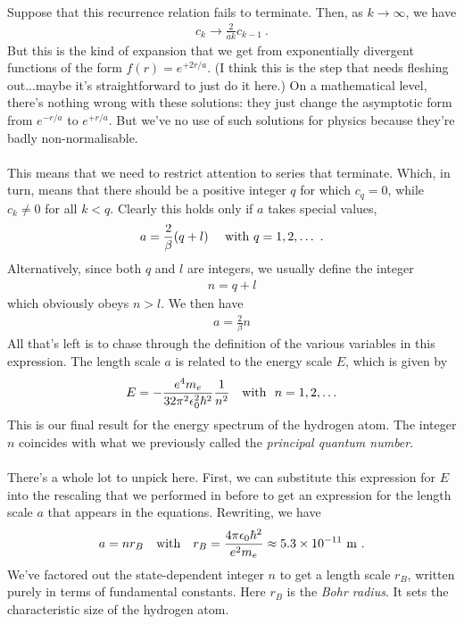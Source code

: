 \documentclass[12pt]{article}
\def\be{\begin{eqnarray}}
\def\ee{\end{eqnarray}}
\newcommand{\nn}{\nonumber}
\newcommand\para{\paragraph{}}
\newcommand{\co}{\color{olive}}
\newcommand{\cblue}{\color{blue}}
\begin{document}
{\para
{\co Suppose that this recurrence relation fails to terminate. Then, as $k\rightarrow \infty$, we have 
%
\be c_{k} \rightarrow \frac{2}{ak} c_{k-1}\ .\ee
%
But this is the kind of expansion that we get from exponentially divergent functions of the form $f(r) = e^{+2r/a}$.} ({\cblue I think this is the step that needs fleshing out...maybe it's straightforward to just do it here.}) On a mathematical level, there's nothing wrong with these solutions: they just change the asymptotic form  from $e^{-r/a}$ to $e^{+r/a}$. But we've no use of such solutions for physics because they're badly non-normalisable.

\para
{\co This means that we  need to restrict attention to series that terminate. Which, in turn, means that there should be a positive integer $q$ for which $c_q=0$, while $c_k\neq 0$ for all $k<q$. Clearly this holds only if $a$ takes special values,
%
\be a = \frac{2}{\beta} (q+l)\ \ \ \ {\rm with}\ q=1,2,\ldots\ .\nn\ee
%
Alternatively, since both $q$ and $l$ are integers, we usually define the integer
%
\be n=q+l\nn\ee
%
which obviously obeys  $n>l$. We then have
%
\be a = \frac{2}{\beta} n\nn\ee
%
}
All that's left is to chase through the definition of the various variables in this expression.  {\co The length scale $a$ is related to the energy scale $E$, which is given by
%
\be E = -\frac{e^4 m_e}{32\pi^2\epsilon_0^2 \hbar^2} \frac{1}{n^2}\ \ \ {\rm with}\  \  n=1,2,\ldots \nn\ee
%
This is our final result for the energy spectrum of the hydrogen atom. The integer $n$ coincides with what we previously called the {\it principal quantum number}. }

\para
There's a whole lot to unpick here. First, we can substitute this expression for $E$ into the rescaling that we performed in before to get an expression for the length scale $a$ that appears in the equations. {\co Rewriting, we have
\be a = nr_B \ \ \ {\rm with}\ \ \ r_B = \frac{4\pi \epsilon_0\hbar^2}{e^2 m_e}  \approx 5.3\times 10^{-11}\ {\rm m}\ .\nn\ee
%
}
 We've factored out the state-dependent integer $n$ to get a length scale $r_B$, written purely in terms of fundamental constants. {\co Here $r_B$ is the {\it Bohr radius}. It sets the characteristic size of the hydrogen atom.}

}
\end{document}
